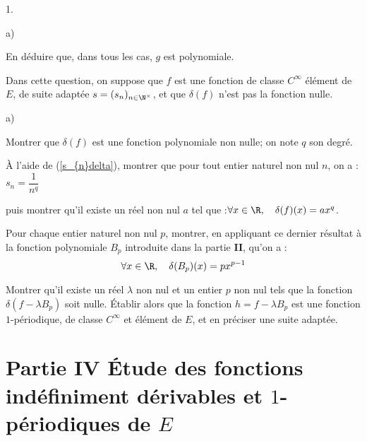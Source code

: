 \documentclass[11pt]{article}%
\begin{document}
\begin{noliste}{1.}
\begin{noliste}{a)}
\item En déduire que, dans tous les cas, $g$ est polynomiale.
\end{noliste}

\item Dans cette question, on suppose que $f$ est une fonction de
classe $C^{\infty }$ élément de $E$, de suite adaptée $s =
(s_{n})_{n\in \N^{\times }}$, et que $\delta (f)$ n'est pas la fonction
nulle.

\begin{noliste}{a)}
 \setlength{\itemsep}{2mm}
\item Montrer que $\delta (f)$ est une fonction polynomiale non nulle;
on
note $q$ son degré.

\item À l'aide de (\ref{s_{n}delta}), montrer que pour tout entier
naturel non
nul $n$, on a :\quad $s_{n} = \dfrac{1}{n^{q}}$

puis montrer qu'il existe un réel non nul $a$ tel que :\quad $\forall
x\in
\R,\quad \delta (f)(x) = ax^{q}$.

\item Pour chaque entier naturel non nul $p$, montrer, en appliquant ce
dernier résultat à la fonction polynomiale $B_{p}$ introduite dans la
partie
\textbf{II}, qu'on a :
\[
\forall x\in \R,\quad \delta (B_{p})(x) = px^{p-1}
\]

\item Montrer qu'il existe un réel $\lambda $ non nul et un entier $p$
non
nul tels que la fonction $\delta (f-\lambda B_{p})$ soit nulle. Établir
alors que la fonction $h = f-\lambda B_{p}$ est une fonction
$1$-périodique,
de classe $C^{\infty }$ et élément de $E$, et en préciser une suite
adaptée.
\end{noliste}
\end{noliste}

\section*{Partie IV Étude des fonctions indéfiniment dérivables et
$1$-périodiques de $E$}
\end{document}
